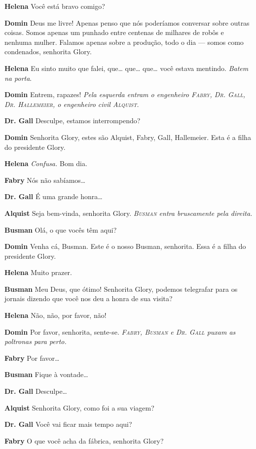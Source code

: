 \textbf{Helena} Você está bravo comigo?

\textbf{Domin} Deus me livre! Apenas penso que nós poderíamos conversar sobre outras
coisas. Somos apenas um punhado entre centenas de milhares de robôs e nenhuma
mulher. Falamos apenas sobre a produção, todo o dia --- somos como 
condenados, senhorita Glory.

\textbf{Helena} Eu sinto muito que falei, que\ldots{} que\ldots{} que\ldots{} você estava mentindo.
\emph{Batem na porta}.

\textbf{Domin} Entrem, rapazes!
\emph{Pela esquerda entram o engenheiro \textsc{Fabry}, \textsc{Dr. Gall}, \textsc{Dr.
Hallemeier}, o engenheiro civil \textsc{Alquist}.}

\textbf{Dr. Gall} Desculpe, estamos interrompendo?

\textbf{Domin} Senhorita Glory, estes são Alquist, Fabry, Gall, Hallemeier.
Esta é a filha do presidente Glory.

\textbf{Helena} \emph{Confusa.} Bom dia.

\textbf{Fabry} Nós não sabíamos\ldots{}

\textbf{Dr. Gall} É uma grande honra\ldots{}

\textbf{Alquist} Seja bem-vinda, senhorita Glory.
\emph{\textsc{Busman} entra bruscamente pela direita.}

\textbf{Busman} Olá, o que vocês têm aqui?

\textbf{Domin} Venha cá, Busman. Este é o nosso Busman, senhorita. Essa é a filha do
presidente Glory.

\textbf{Helena} Muito prazer.

\textbf{Busman} Meu Deus, que ótimo! Senhorita Glory, podemos telegrafar para os jornais
dizendo que você nos deu a honra de sua visita?

\textbf{Helena} Não, não, por favor, não!

\textbf{Domin} Por favor, senhorita, sente-se.
\emph{\textsc{Fabry}, \textsc{Busman} e \textsc{Dr. Gall} puxam as poltronas para perto.}

\textbf{Fabry} Por favor\ldots{}

\textbf{Busman} Fique à vontade\ldots{}

\textbf{Dr. Gall} Desculpe\ldots{}

\textbf{Alquist} Senhorita Glory, como foi a sua viagem?

\textbf{Dr. Gall} Você vai ficar mais tempo aqui?

\textbf{Fabry} O que você acha da fábrica, senhorita Glory?

